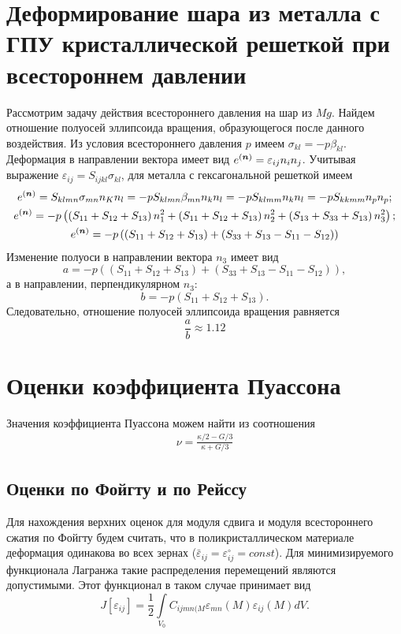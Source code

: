 \documentclass[12pt, a4paper]{article}
\renewcommand{\vec}[1]{\text{\mathversion{bold}${#1}$}}%
\begin{document}
\section{Деформирование шара из металла с ГПУ кристаллической решеткой при всестороннем давлении}

Рассмотрим задачу действия всестороннего давления на шар из $Mg$. Найдем отношение полуосей эллипсоида вращения, образующегося после данного воздействия.
Из условия всестороннего давления $p$ имеем $\sigma_{kl} = - p \beta_{kl}$.
Деформация в направлении вектора имеет вид $e^{(\vec{n})} = \varepsilon_{ij}n_in_j$.
Учитывая выражение $\varepsilon_{ij} = S_{ijkl}\sigma_{kl}$, для металла
с гексагональной решеткой имеем
\begin{gather*}
e^{(\vec{n})} = S_{klmn} \sigma_{mn} n_K n_l = - p S_{klmn} \beta_{mn} n_k n_l = - p S_{klmm} n_k n_l = - p S_{kkmm}n_p n_p;\\
e^{(\vec{n})} = -p \left(\left(S_{11} + S_{12} + S_{13} \right)n_1^2 + \left(S_{11} + S_{12} + S_{13} \right)n_2^2 + \left(S_{13} + S_{33} + S_{13} \right)n_3^2 \right);\\
e^{(\vec{n})} = -p \left( \left( S_{11} + S_{12} + S_{13}\right) + \left( S_{33} + S_{13} - S_{11} - S_{12}\right) \right)
\end{gather*}
Изменение полуоси в направлении вектора $n_3$ имеет вид
\[
a = - p \left( \left( S_{11} + S_{12} + S_{13}\right) + \left( S_{33} + S_{13} - S_{11} - S_{12}\right) \right),
\]
а в направлении, перпендикулярном $n_3$:
\[
b = -p  \left( S_{11} + S_{12} + S_{13}\right).
\]
Следовательно, отношение полуосей эллипсоида вращения равняется
\[
\frac{a}{b} \approx 1.12
\]

\section{Оценки коэффициента Пуассона}
Значения коэффициента Пуассона можем найти из соотношения 
\begin{gather}
	\label{puasson-4}
	\nu = \frac{\kappa / 2 - G / 3}{\kappa + G / 3}
\end{gather}

\subsection{Оценки по Фойгту и по Рейссу}
Для нахождения верхних оценок для модуля сдвига и модуля всестороннего сжатия по Фойгту будем считать, что в поликристаллическом материале деформация одинакова во всех зернах ($\bar{\varepsilon}_{ij} = \varepsilon_{ij}^{\circ} = const$).
Для минимизируемого функционала Лагранжа такие распределения перемещений являются допустимыми. Этот функционал в таком случае принимает вид
\[
J[\varepsilon_{ij}] = \frac{1}{2} \int \limits_{V_0} {C_{ijmn (M} \varepsilon_{mn} (M) \varepsilon_{ij} (M) d V}.
\]
\end{document}
